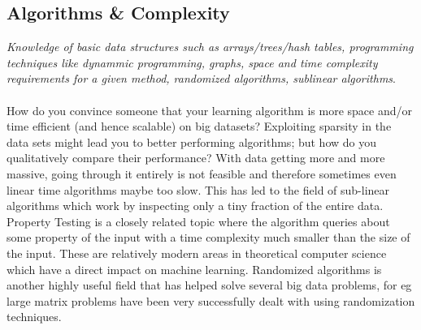 \documentclass[a4paper]{article}
\begin{document}
\subsection{Algorithms \& Complexity}
\textit{Knowledge of basic data structures such as arrays/trees/hash tables, programming techniques like dynammic programming, graphs, space and time complexity requirements for a given method, randomized algorithms, sublinear algorithms}.\\ \\
How do you convince someone that your learning algorithm is more space and/or time efficient (and hence scalable) on big datasets? Exploiting sparsity in the data sets might lead you to better performing algorithms; but how do you qualitatively compare their performance? With data getting more and more massive, going through it entirely is not feasible and therefore sometimes even linear time algorithms maybe too slow. This has led to the field of sub-linear algorithms which work by inspecting only a tiny fraction of the entire data. Property Testing is a closely related topic where the algorithm queries about some property of the input with a time complexity much smaller than the size of the input. These are relatively modern areas in theoretical computer science which have a direct impact on machine learning. Randomized algorithms is another highly useful field that has helped solve several big data problems, for eg large matrix problems have been very successfully dealt with using randomization techniques.\\
\end{document}
